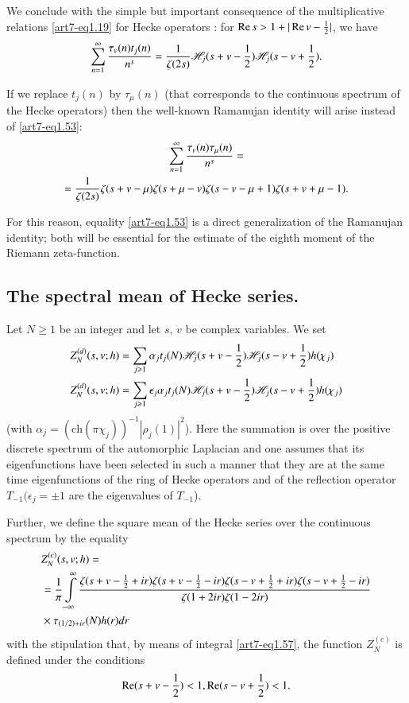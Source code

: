 We conclude with the simple but important consequence of the multiplicative relations \eqref{art7-eq1.19} for Hecke operators : for $\operatorname{Re} s>1 + |\operatorname{Re}  v- \frac{1}{2}|$, we have
\begin{equation}
\sum\limits^\infty_{n=1} \frac{\tau_v (n) t_j (n)}{n^s} = \frac{1}{\zeta(2s)} \mathscr{H}_j(s+v-\frac{1}{2}) \mathscr{H}_j(s - v + \frac{1}{2}).
\label{art7-eq1.53}
\end{equation}

If we replace $t_j(n)$ by $\tau_\mu(n)$ (that corresponds to the continuous spectrum of the Hecke operators) then the well-known Ramanujan identity will arise instead of \eqref{art7-eq1.53}:
\begin{gather}
\sum\limits^\infty_{n=1} \frac{\tau_v(n) \tau_\mu(n)}{n^s} =  \label{art7-eq1.54}\\
=\frac{1}{\zeta(2s)} \zeta(s+v -\mu) \zeta(s+\mu-v) \zeta(s-v-\mu +1) \zeta(s+v+\mu -1). \notag
\end{gather}

For this reason, equality \eqref{art7-eq1.53} is a direct generalization of the Ramanujan identity; both will be essential for the estimate of the eighth moment of the Riemann zeta-function.

\subsection{The spectral mean of Hecke series.}\label{art7-subsec1.9}
Let  $N\geqslant 1$ be an integer and let $s$, $v$ be complex variables. We set 
\begin{align}
Z^{(d)}_N (s, v; h) &= \sum\limits_{j \geqslant 1}  \alpha_j t_j (N) \mathscr{H}_j (s+v -\frac{1}{2}) \mathscr{H}_j(s-v+\frac{1}{2}) h (\chi_j) \label{art7-eq1.55}\\
Z^{(d)}_N (s, v; h) & = \sum\limits_{j \geqslant 1} \epsilon_j \alpha_j t_j (N) \mathscr{H}_j (s+v -\frac{1}{2}) \mathscr{H}_j (s-v+\frac{1}{2}) h (\chi_j) \label{art7-eq1.56}
\end{align}
(with $\alpha_j = (\text{ch}(\pi\chi_j))^{-1} |\rho_j(1)|^2$). Here the summation is over the positive discrete spectrum of the automorphic Laplacian and one assumes that its eigenfunctions have been selected in such a manner that they are at the same time eigenfunctions of the ring of Hecke operators and of the reflection operator $T_{-1} (\epsilon_j = \pm 1$ are the eigenvalues of $T_{-1}$).

Further, we define the square mean of the Hecke series over the continuous spectrum by the equality
{\fontsize{10}{12}\selectfont
\begin{align}
&Z^{(c)}_N(s,v;h) = \label{art7-eq1.57} \\
&=\frac{1}{\pi} \int\limits^\infty_{-\infty} \frac{\zeta (s+v-\frac{1}{2} +ir) \zeta(s+v-\frac{1}{2}-ir) \zeta (s-v+\frac{1}{2} + ir) \zeta(s-v+\frac{1}{2} -ir)}{\zeta (1+2ir) \zeta(1-2ir)} \notag\\
& \times \tau_{(1/2) + ir} (N) h(r) dr \notag
\end{align}}\relax\pageoriginale
with the stipulation that, by means of integral \eqref{art7-eq1.57}, the function $Z^{(c)}_N$ is defined under the conditions
$$
\operatorname{Re}(s+v-\frac{1}{2}) < 1, \operatorname{Re} (s-v + \frac{1}{2}) < 1.
$$

